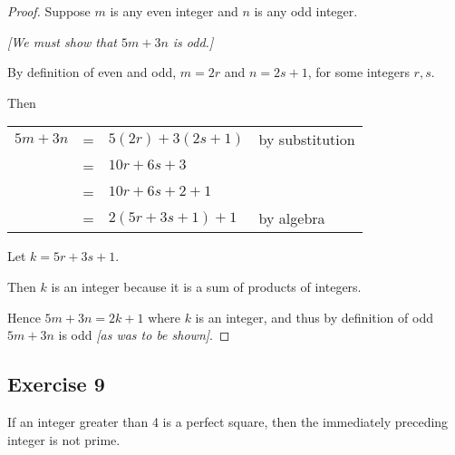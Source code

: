 \documentclass[14pt]{extarticle}
\newcommand{\cy}{\color{cyan}}
\begin{document}
\begin{proof}
    Suppose $m$ is any even integer and $n$ is any odd integer.

        {\it [We must show that $5m+3n$ is odd.]}

    By definition of even and odd, $m = 2r$ and $n = 2s+1$, for some integers $r, s$.

    Then

    \begin{center}
        \begin{tabular}{rcll}
            $5m+3n$ & = & $5(2r)+3(2s+1)$ & \cy by substitution \\
                    & = & $10r+6s+3$      &                     \\
                    & = & $10r+6s+2+1$    &                     \\
                    & = & $2(5r+3s+1)+1$  & \cy by algebra      \\
        \end{tabular}
    \end{center}

    Let $k = 5r+3s+1$.

    Then $k$ is an integer because it is a sum of products of integers.

    Hence $5m+3n = 2k+1$ where $k$ is an integer, and thus by definition of odd $5m+3n$ is odd {\it [as was to be shown]}.
\end{proof}

\subsection{Exercise 9}
If an integer greater than 4 is a perfect square, then the immediately preceding integer is not prime.
\end{document}
